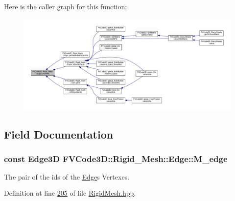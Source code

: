 Here is the caller graph for this function\+:
\nopagebreak
\begin{figure}[H]
\begin{center}
\leavevmode
\includegraphics[width=350pt]{classFVCode3D_1_1Rigid__Mesh_1_1Edge_aedaf9a2d04ce829ee8bea9cf7eb0b6dd_icgraph}
\end{center}
\end{figure}




\subsection{Field Documentation}
\subsubsection[{\texorpdfstring{M\+\_\+edge}{M_edge}}]{\setlength{\rightskip}{0pt plus 5cm}const {\bf Edge3D} F\+V\+Code3\+D\+::\+Rigid\+\_\+\+Mesh\+::\+Edge\+::\+M\+\_\+edge\hspace{0.3cm}{\ttfamily [protected]}}\hypertarget{classFVCode3D_1_1Rigid__Mesh_1_1Edge_af8573366715c188a54326703bbf90e72}{}\label{classFVCode3D_1_1Rigid__Mesh_1_1Edge_af8573366715c188a54326703bbf90e72}


The pair of the ids of the \hyperlink{classFVCode3D_1_1Rigid__Mesh_1_1Edge}{Edge}\textquotesingle{}s Vertexes. 



Definition at line \hyperlink{RigidMesh_8hpp_source_l00205}{205} of file \hyperlink{RigidMesh_8hpp_source}{Rigid\+Mesh.\+hpp}.

